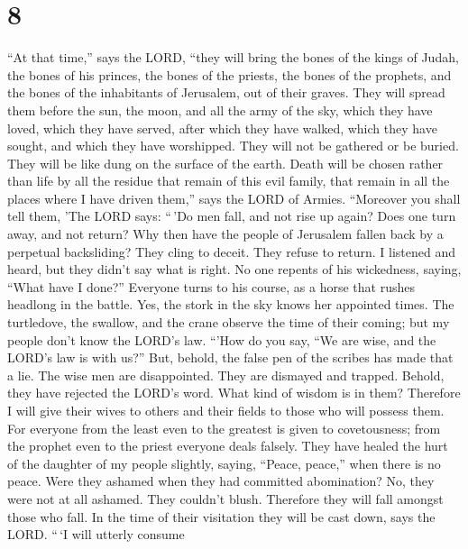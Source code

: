 \hypertarget{section-7}{%
\section{8}\label{section-7}}

 ``At that time,'' says the LORD, ``they will bring the
bones of the kings of Judah, the bones of his princes, the bones of the
priests, the bones of the prophets, and the bones of the inhabitants of
Jerusalem, out of their graves.  They will spread them
before the sun, the moon, and all the army of the sky, which they have
loved, which they have served, after which they have walked, which they
have sought, and which they have worshipped. They will not be gathered
or be buried. They will be like dung on the surface of the earth.
 Death will be chosen rather than life by all the residue
that remain of this evil family, that remain in all the places where I
have driven them,'' says the LORD of Armies.  ``Moreover you
shall tell them, 'The LORD says: ``\,'Do men fall, and not rise up
again? Does one turn away, and not return?  Why then have
the people of Jerusalem fallen back by a perpetual backsliding? They
cling to deceit. They refuse to return.  I listened and
heard, but they didn't say what is right. No one repents of his
wickedness, saying, ``What have I done?'' Everyone turns to his course,
as a horse that rushes headlong in the battle.  Yes, the
stork in the sky knows her appointed times. The turtledove, the swallow,
and the crane observe the time of their coming; but my people don't know
the LORD's law.  ``'How do you say, ``We are wise, and the
LORD's law is with us?'' But, behold, the false pen of the scribes has
made that a lie.  The wise men are disappointed. They are
dismayed and trapped. Behold, they have rejected the LORD's word. What
kind of wisdom is in them?  Therefore I will give their
wives to others and their fields to those who will possess them. For
everyone from the least even to the greatest is given to covetousness;
from the prophet even to the priest everyone deals falsely.
 They have healed the hurt of the daughter of my people
slightly, saying, ``Peace, peace,'' when there is no peace.
 Were they ashamed when they had committed abomination? No,
they were not at all ashamed. They couldn't blush. Therefore they will
fall amongst those who fall. In the time of their visitation they will
be cast down, says the LORD.  ``\,`I will utterly consume
